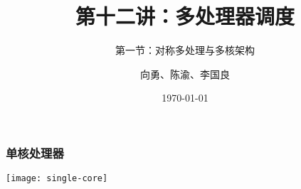 


\title[第12讲]{第十二讲：多处理器调度} %
\subtitle{第一节：对称多处理与多核架构}
\author{向勇、陈渝、李国良} %
\date{\today} %




\begin{frame}
\titlepage %
\end{frame}

%
%

\begin{frame}[fragile]
    \frametitle{单核处理器}	
    \centering
    \texttt{[image: single-core]}
		
\end{frame}

